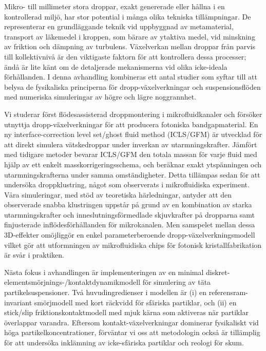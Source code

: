 \begin{abstrakt}
Mikro- till millimeter stora droppar, exakt genererade eller hållna i en kontrollerad miljö, har stor potential i många olika tekniska tillämpningar. De representerar en grundläggande teknik vid uppbyggnad av metamaterial, transport av läkemedel i kroppen, som bärare av ytaktiva medel, vid minskning av friktion och dämpning av turbulens. Växelverkan mellan droppar från parvis till kollektivnivå är den viktigaste faktorn för att kontrollera dessa processer; ändå är lite känt om de detaljerade mekanismerna vid olika icke-ideala förhållanden. I denna avhandling kombineras ett antal studier som syftar till att belysa de fysikaliska principerna för dropp-växelverkningar och suspensionsflöden med numeriska simuleringar av högre och lägre noggrannhet.

Vi studerar först flödesassisterad droppmontering i mikrofluidkanaler och försöker utnyttja dropp-växelverkningar för att producera fotoniska bandgapmaterial. En ny interface-correction level set/ghost fluid method (ICLS/GFM) är utvecklad för att direkt simulera vätskedroppar under inverkan av utarmningskrafter. Jämfört med tidigare metoder bevarar ICLS/GFM den totala massan för varje fluid med hjälp av ett enkelt masskorrigeringsschema, och beräknar exakt ytspänningen och utarmningskrafterna under samma omständigheter. Detta tillämpas sedan för att undersöka droppklustring, något som observerats i mikrofluidiska experiment. Våra simuleringar, med stöd av teoretiska härledningar, antyder att den observerade snabba klustringen uppstår på grund av en kombination av starka utarmningskrafter och inneslutningsförmedlade skjuvkrafter på dropparna samt finjusterade inflödesförhållanden för mikrokanalen. Men samspelet mellan dessa 3D-effekter omöjliggör en enkel parameterberoende dropp-växelverkningsmodell vilket gör att utformningen av mikrofluidiska chips för fotonisk kristallfabrikation är svår i praktiken.

Nästa fokus i avhandlingen är implementeringen av en minimal diskret-elementsmörjnings-/kontaktdynamikmodell för simulering av täta partikelsuspensioner. Två huvudingredienser i modellen är (i) en referensram-invariant smörjmodell med kort räckvidd för sfäriska partiklar, och (ii) en stick/slip friktionskontaktmodell med mjuk kärna som aktiveras när partiklar överlappar varandra. Eftersom kontakt-växelverkningar dominerar fysikaliskt vid höga partikelkoncentrationer, förväntar vi oss att metodologin också är tillämplig för att undersöka inklämning av icke-sfäriska partiklar och reologi för skum.


\end{abstrakt}
